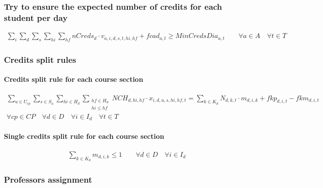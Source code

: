 
\subsubsection{Try to ensure the expected number of credits for each student per day}
\begin{eqnarray}
\sum\limits_{i} \sum\limits_{d} \sum\limits_{s} \sum\limits_{hi} \sum\limits_{hf} nCreds_{d} \cdot v_{a,i,d,s,t,hi,hf} + fcad_{a,t} \ge MinCredsDia_{a,t} \nonumber \qquad
\forall a \in A \quad
\forall t \in T
\end{eqnarray}


\subsubsection{Credits split rules}

\paragraph{Credits split rule for each course section}
\begin{eqnarray}
\sum\limits_{u \in U_{cp}} \sum\limits_{s \in S_{u}} \sum\limits_{hi \in H_{d}} \sum_{\substack {hf \in H_{d} \\ hi\le hf}}
 NCH_{d,hi,hf} \cdot x_{i,d,u,s,hi,hf,t} = \sum\limits_{k \in K_{d}}N_{d,k,t} \cdot m_{d,i,k} + fkp_{d,i,t} - fkm_{d,i,t} \nonumber \qquad 
\\
\forall cp \in CP \quad
\forall d \in D \quad
\forall i \in I_{d} \quad
\forall t \in T
\end{eqnarray}

\paragraph{Single credits split rule for each course section}
\begin{eqnarray}
\sum\limits_{k \in K_{d}} m_{d,i,k} \leq 1 \nonumber \qquad 
\forall d \in D \quad
\forall i \in I_{d}
\end{eqnarray}


\subsubsection{Professors assignment}

